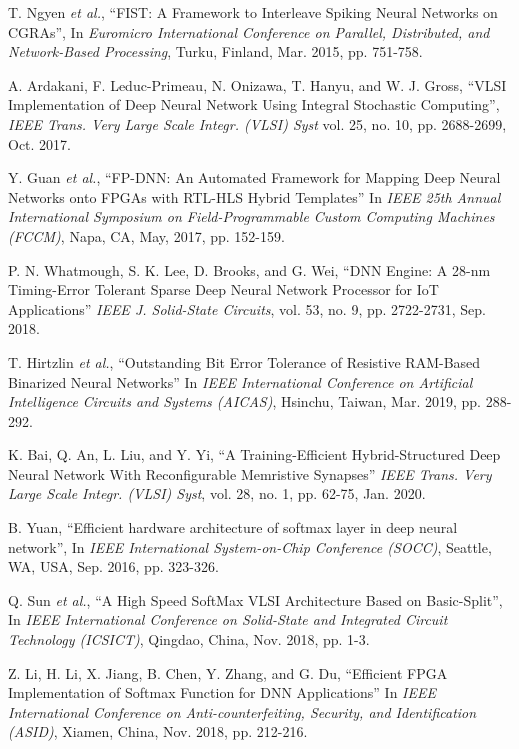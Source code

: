 \documentclass[journal]{IEEEtran}
\begin{document}
\begin{thebibliography}{9}
T. Ngyen \textit{et al.}, ``FIST: A Framework to Interleave Spiking Neural Networks on CGRAs'', In \textit{Euromicro International Conference on Parallel, Distributed, and Network-Based Processing}, Turku, Finland, Mar. 2015, pp. 751-758.

A. Ardakani, F. Leduc-Primeau, N. Onizawa, T. Hanyu, and W. J. Gross, ``VLSI Implementation of Deep Neural Network Using Integral Stochastic Computing'',  \textit{IEEE Trans. Very Large Scale Integr. (VLSI) Syst} vol. 25, no. 10, pp. 2688-2699, Oct. 2017.

Y. Guan \textit{et al.}, ``FP-DNN: An Automated Framework for Mapping Deep Neural Networks onto FPGAs with RTL-HLS Hybrid Templates'' In \textit{IEEE 25th Annual International Symposium on Field-Programmable Custom Computing Machines (FCCM)}, Napa, CA, May, 2017, pp. 152-159.

P. N. Whatmough, S. K. Lee, D. Brooks, and G. Wei, ``DNN Engine: A 28-nm Timing-Error Tolerant Sparse Deep Neural Network Processor for IoT Applications''  \textit{IEEE J. Solid-State Circuits}, vol. 53, no. 9, pp. 2722-2731, Sep. 2018.


T. Hirtzlin \textit{et al.}, ``Outstanding Bit Error Tolerance of Resistive RAM-Based Binarized Neural Networks'' In \textit{IEEE International Conference on Artificial Intelligence Circuits and Systems (AICAS)}, Hsinchu, Taiwan, Mar. 2019, pp. 288-292.


K. Bai, Q. An, L. Liu, and Y. Yi, ``A Training-Efficient Hybrid-Structured Deep Neural Network With Reconfigurable Memristive Synapses''  \textit{IEEE Trans. Very Large Scale Integr. (VLSI) Syst}, vol. 28, no. 1, pp. 62-75, Jan. 2020.

B. Yuan, ``Efficient hardware architecture of softmax layer in deep neural network'', In \textit{IEEE International System-on-Chip Conference (SOCC)}, Seattle, WA, USA, Sep. 2016, pp. 323-326.


Q. Sun \textit{et al.}, ``A High Speed SoftMax VLSI Architecture Based on Basic-Split'', In \textit{IEEE International Conference on Solid-State and Integrated Circuit Technology (ICSICT)}, Qingdao, China, Nov. 2018, pp. 1-3.

Z. Li, H. Li, X. Jiang, B. Chen, Y. Zhang, and G. Du, ``Efficient FPGA Implementation of Softmax Function for DNN Applications''  In \textit{IEEE International Conference on Anti-counterfeiting, Security, and Identification (ASID)}, Xiamen, China, Nov. 2018, pp. 212-216.



\end{thebibliography}
\end{document}
